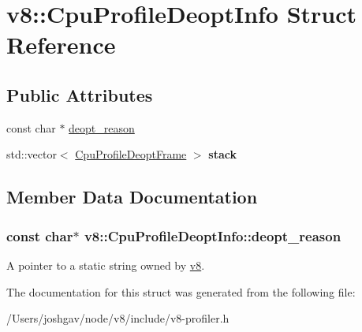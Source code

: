\hypertarget{structv8_1_1_cpu_profile_deopt_info}{}\section{v8\+:\+:Cpu\+Profile\+Deopt\+Info Struct Reference}
\label{structv8_1_1_cpu_profile_deopt_info}
\subsection*{Public Attributes}
\begin{DoxyCompactItemize}
\item 
const char $\ast$ \hyperlink{structv8_1_1_cpu_profile_deopt_info_a908eb3ba33b47ace8973eeb2fda96ca9}{deopt\+\_\+reason}
\item 
std\+::vector$<$ \hyperlink{structv8_1_1_cpu_profile_deopt_frame}{Cpu\+Profile\+Deopt\+Frame} $>$ {\bfseries stack}\hypertarget{structv8_1_1_cpu_profile_deopt_info_a9446493c0e0a00e3ada02ba8df858d42}{}\label{structv8_1_1_cpu_profile_deopt_info_a9446493c0e0a00e3ada02ba8df858d42}

\end{DoxyCompactItemize}


\subsection{Member Data Documentation}
\subsubsection[{\texorpdfstring{deopt\+\_\+reason}{deopt_reason}}]{\setlength{\rightskip}{0pt plus 5cm}const char$\ast$ v8\+::\+Cpu\+Profile\+Deopt\+Info\+::deopt\+\_\+reason}\hypertarget{structv8_1_1_cpu_profile_deopt_info_a908eb3ba33b47ace8973eeb2fda96ca9}{}\label{structv8_1_1_cpu_profile_deopt_info_a908eb3ba33b47ace8973eeb2fda96ca9}
A pointer to a static string owned by \hyperlink{namespacev8}{v8}. 

The documentation for this struct was generated from the following file\+:\begin{DoxyCompactItemize}
\item 
/\+Users/joshgav/node/v8/include/v8-\/profiler.\+h\end{DoxyCompactItemize}
